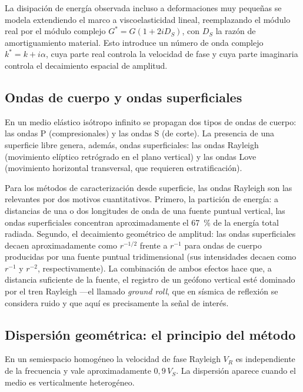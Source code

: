 La disipaci\'on de energ\'ia observada incluso a deformaciones muy peque\~nas se modela
extendiendo el marco a viscoelasticidad lineal, reemplazando el m\'odulo real por el
m\'odulo complejo $G^{*}=G(1+2iD_S)$, con $D_S$ la raz\'on de amortiguamiento material.
Esto introduce un n\'umero de onda complejo $k^{*}=k+i\alpha$, cuya parte real controla
la velocidad de fase y cuya parte imaginaria controla el decaimiento espacial de
amplitud.

\subsection{Ondas de cuerpo y ondas superficiales}

En un medio el\'astico is\'otropo infinito se propagan dos tipos de ondas de cuerpo: las
ondas P (compresionales) y las ondas S (de corte). La presencia de una superficie libre
genera, adem\'as, ondas superficiales: las ondas Rayleigh (movimiento el\'iptico retr\'ogrado
en el plano vertical) y las ondas Love (movimiento horizontal transversal, que requieren
estratificaci\'on).

Para los m\'etodos de caracterizaci\'on desde superficie, las ondas Rayleigh son las
relevantes por dos motivos cuantitativos. Primero, la partici\'on de energ\'ia: a distancias
de una o dos longitudes de onda de una fuente puntual vertical, las ondas superficiales
concentran aproximadamente el \SI{67}{\percent} de la energ\'ia total radiada. Segundo,
el decaimiento geom\'etrico de amplitud: las ondas superficiales decaen aproximadamente
como $r^{-1/2}$ frente a $r^{-1}$ para ondas de cuerpo producidas por una fuente puntual
tridimensional (sus intensidades decaen como $r^{-1}$ y $r^{-2}$, respectivamente). La
combinaci\'on de ambos efectos hace
que, a distancia suficiente de la fuente, el registro de un ge\'ofono vertical est\'e
dominado por el tren Rayleigh ---el llamado \emph{ground roll}, que en s\'ismica de
reflexi\'on se considera ruido y que aqu\'i es precisamente la se\~nal de inter\'es.

\subsection{Dispersi\'on geom\'etrica: el principio del m\'etodo}

En un semiespacio homog\'eneo la velocidad de fase Rayleigh $V_R$ es independiente de la
frecuencia y vale aproximadamente $0{,}9\,V_S$. La dispersi\'on aparece cuando el medio
es verticalmente heterog\'eneo.

